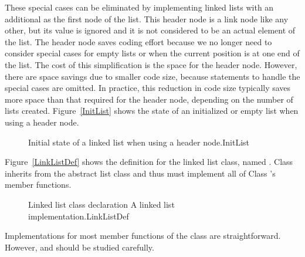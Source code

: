 These special cases can be eliminated by implementing
linked lists with an additional 
as the first node of the list.
This header node is a link node like any other, but its value is
ignored and it is not considered to be an actual element of the list.
The header node saves coding effort because we no longer need to
consider special cases for empty lists or when the current position is
at one end of the list.
The cost of this simplification is the space for the header node.
However, there are space savings due to smaller code size,
because statements to handle the special cases are omitted.
In practice, this reduction in code size typically saves more space
than that required for the header node, depending on the number of
lists created.
Figure~\ref{InitList} shows the state of an initialized or empty list
when using a header node.

\begin{figure}
\vspace{-\bigskipamount}\vspace{-\bigskipamount}
\vspace{-\smallskipamount}

{Initial state of a linked list when using a header node.}{InitList}
\vspace{-\smallskipamount}
\end{figure}

Figure~\ref{LinkListDef} shows the definition
for the linked list class, named .
Class  inherits
from the abstract list class and
thus must implement all of Class 's member functions.

\begin{figure}
\vspace{-\medskipamount}
\capt{4.5in}
{Linked list class declaration}
{A linked list implementation.}{LinkListDef}
\end{figure}

\begin{figure}
\vspace{-\smallskipamount}
\captcont
\end{figure}


Implementations for most member functions of the 
class are straightforward.
However,  and 
should be studied carefully.


